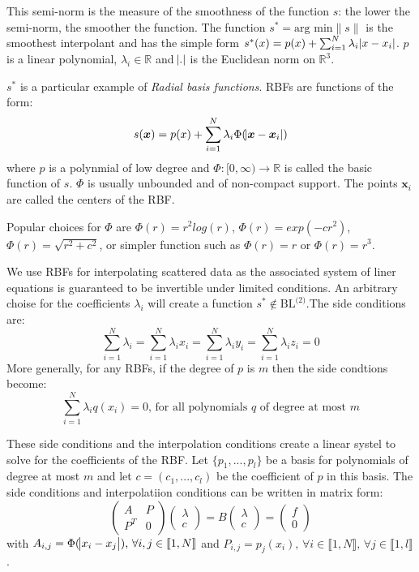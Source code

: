 \documentclass[a4paper]{article}
\begin{document}
This semi-norm is the measure of the smoothness of the function $s$: the lower the semi-norm, the smoother the function. The function $s^* = \text{arg min} \|s\|$ is the smoothest interpolant and has the simple form $s^*(x) = p(x) + \sum_{i = 1}^{N}\lambda_i\abs{x - x_i}$. $p$ is a linear polynomial, $\lambda_i \in \mathbb{R}$ and $\abs{.}$ is the Euclidean norm on $\mathbb{R}^3$.

$s^*$ is a particular example of \emph{Radial basis functions}. RBFs are functions of the form:
$$s(\boldsymbol{x}) = p(x) + \sum_{i=1}^{N}\lambda_i\Phi(\abs{\boldsymbol{x} - \boldsymbol{x}_i})$$
where $p$ is a polynmial of low degree and $\Phi:[0,\infty) \to \mathbb{R}$ is called the basic function of $s$. $\Phi$ is usually unbounded and of non-compact support. The points $\boldsymbol{x}_i$ are called the centers of the RBF.

Popular choices for $\Phi$ are $\Phi(r) = r^2log(r)$, $\Phi(r) = exp(-cr^2)$, $\Phi(r) = \sqrt{r^2+c^2}$, or simpler function such as $\Phi(r) = r$ or $\Phi(r) = r^3$.

We use RBFs for interpolating scattered data as the associated system of liner equations is guaranteed to be invertible under limited conditions. An arbitrary choise for the coefficients $\lambda_i$ will create a function $s^* \notin \text{BL}^{\text{(2)}}$.The side conditions are:
$$\sum_{i = 1}^{N}\lambda_i =  \sum_{i = 1}^{N}\lambda_i x_i = \sum_{i = 1}^{N}\lambda_i y_i =\sum_{i = 1}^{N}\lambda_i z_i = 0$$
More generally, for any RBFs, if the degree of $p$ is $m$ then the side condtions become:
$$\sum_{i = 1}^{N}\lambda_i q(x_i) = 0\text{, for all polynomials }q\text{ of degree at most }m$$

These side conditions and the interpolation conditions create a linear systel to solve for the coefficients of the RBF. Let $\{p_1, ..., p_l\}$ be a basis for polynomials of degree at most $m$ and let $c = (c_1, ..., c_l)$ be the coefficient of $p$ in this basis. The side conditions and interpolatiion conditions can be written in matrix form:
$$
\begin{pmatrix}
A & P \\
P^T & 0
\end{pmatrix}
\begin{pmatrix}
\lambda \\
c
\end{pmatrix}
= B
\begin{pmatrix}
\lambda \\
c
\end{pmatrix}
=
\begin{pmatrix}
f \\
0
\end{pmatrix}
$$
with $A_{i,j} = \Phi(\abs{x_i - x_j})\text{, }\forall i,j \in \llbracket 1, N\rrbracket$ and $P_{i,j} = p_j(x_i)\text{, }\forall i \in \llbracket 1, N\rrbracket\text{, }\forall j \in \llbracket 1, l\rrbracket$.
\end{document}
